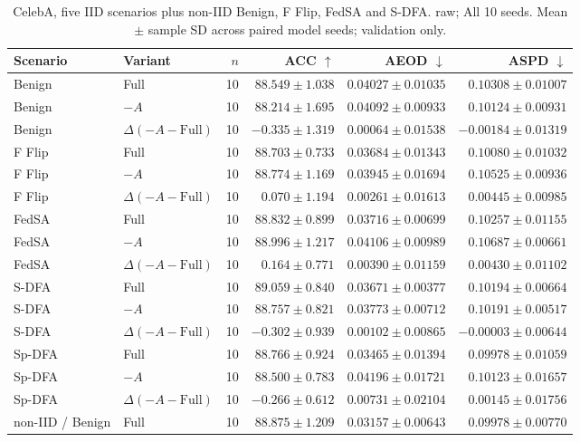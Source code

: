 \begin{table}[t]
\centering
\small
\caption{CelebA, five IID scenarios plus non-IID Benign, F Flip, FedSA and S-DFA. raw; All 10 seeds. Mean $\pm$ sample SD across paired model seeds; validation only.}
\begin{tabular}{llrrrr}
\toprule
Scenario & Variant & $n$ & ACC $\uparrow$ & AEOD $\downarrow$ & ASPD $\downarrow$ \\
\midrule
Benign & Full & 10 & $88.549 \pm 1.038$ & $0.04027 \pm 0.01035$ & $0.10308 \pm 0.01007$ \\
Benign & $-A$ & 10 & $88.214 \pm 1.695$ & $0.04092 \pm 0.00933$ & $0.10124 \pm 0.00931$ \\
Benign & $\Delta(-A-\mathrm{Full})$ & 10 & $-0.335 \pm 1.319$ & $0.00064 \pm 0.01538$ & $-0.00184 \pm 0.01319$ \\
F Flip & Full & 10 & $88.703 \pm 0.733$ & $0.03684 \pm 0.01343$ & $0.10080 \pm 0.01032$ \\
F Flip & $-A$ & 10 & $88.774 \pm 1.169$ & $0.03945 \pm 0.01694$ & $0.10525 \pm 0.00936$ \\
F Flip & $\Delta(-A-\mathrm{Full})$ & 10 & $0.070 \pm 1.194$ & $0.00261 \pm 0.01613$ & $0.00445 \pm 0.00985$ \\
FedSA & Full & 10 & $88.832 \pm 0.899$ & $0.03716 \pm 0.00699$ & $0.10257 \pm 0.01155$ \\
FedSA & $-A$ & 10 & $88.996 \pm 1.217$ & $0.04106 \pm 0.00989$ & $0.10687 \pm 0.00661$ \\
FedSA & $\Delta(-A-\mathrm{Full})$ & 10 & $0.164 \pm 0.771$ & $0.00390 \pm 0.01159$ & $0.00430 \pm 0.01102$ \\
S-DFA & Full & 10 & $89.059 \pm 0.840$ & $0.03671 \pm 0.00377$ & $0.10194 \pm 0.00664$ \\
S-DFA & $-A$ & 10 & $88.757 \pm 0.821$ & $0.03773 \pm 0.00712$ & $0.10191 \pm 0.00517$ \\
S-DFA & $\Delta(-A-\mathrm{Full})$ & 10 & $-0.302 \pm 0.939$ & $0.00102 \pm 0.00865$ & $-0.00003 \pm 0.00644$ \\
Sp-DFA & Full & 10 & $88.766 \pm 0.924$ & $0.03465 \pm 0.01394$ & $0.09978 \pm 0.01059$ \\
Sp-DFA & $-A$ & 10 & $88.500 \pm 0.783$ & $0.04196 \pm 0.01721$ & $0.10123 \pm 0.01657$ \\
Sp-DFA & $\Delta(-A-\mathrm{Full})$ & 10 & $-0.266 \pm 0.612$ & $0.00731 \pm 0.02104$ & $0.00145 \pm 0.01756$ \\
non-IID / Benign & Full & 10 & $88.875 \pm 1.209$ & $0.03157 \pm 0.00643$ & $0.09978 \pm 0.00770$ \\

\end{tabular}
\end{table}
